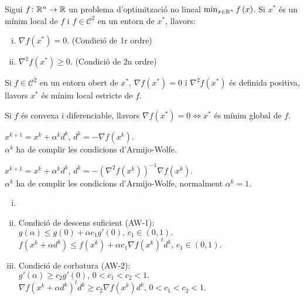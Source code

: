 \begin{teo*}
    Sigui $f \colon \mathbb{R}^n \to \mathbb{R}$ un problema d'optimitzaci\'o no lineal $\min_{x\in\mathbb{R}^n} f\left( x \right)$. Si $x^*$ \'es un m\'inim local de $f$ i $f \in \mathcal{C}^2$ en un entorn de $x^*$, llavors:
    \begin{enumerate}[i)]
        \item $\nabla f\left( x^* \right) = 0$. (Condici\'o de 1r ordre)
        \item $\nabla^2 f\left( x^* \right) \geq 0$. (Condici\'o de 2n ordre)
    \end{enumerate}
\end{teo*}
\begin{teo*}
    Si $f \in \mathcal{C}^2$ en un entorn obert de $x^*$, $\nabla f\left( x^* \right) = 0$ i $\nabla^2 f\left( x^* \right)$ \'es definida positiva, llavors $x^*$ \'es m\'inim local estricte de $f$.
\end{teo*}
\begin{teo*}
    Si $f$ \'es convexa i diferenciable, llavors $\nabla f\left( x^* \right) = 0 \iff x^*$ \'es m\'inim global de $f$.
\end{teo*}
\begin{met}
    $x^{k+1} = x^k + \alpha^kd^k$, \quad $d^k = -\nabla f\left( x^k \right)$. \\
    $\alpha^k$ ha de complir les condicions d'Armijo-Wolfe.
\end{met}
\begin{met}[de Newton]
    $x^{k+1} = x^k + \alpha^kd^k$, \quad $d^k = -\left( \nabla^2 f\left( x^k \right) \right)^{-1} \nabla f\left( x^k \right)$. \\
    $\alpha^k$ ha de complir les condicions d'Armijo-Wolfe, normalment $\alpha^k = 1$.
\end{met}
\begin{prop}
    \begin{enumerate}[i)]
        \item[]
        \item Condici\'o de descens suficient (AW-1): \\
            $g\left( \alpha \right) \leq g\left( 0 \right) + \alpha c_1g'\left( 0 \right),\, c_1 \in (0,1).$ \\
            $f\left( x^k + \alpha d^k \right) \leq f\left( x^k \right) + \alpha c_1 \nabla f\left( x^k \right)^t d^k,\, c_1 \in (0,1).$
        \item Condici\'o de corbatura (AW-2): \\
            $g'\left( \alpha \right) \geq c_2 g'\left( 0 \right),\, 0 < c_1 < c_2 < 1.$ \\
            $\nabla f\left( x^k + \alpha d^k \right)^td^k \geq c_2 \nabla f\left( x^k \right)d^k,\, 0 < c_1 < c_2 < 1$.
    \end{enumerate}
\end{prop}

